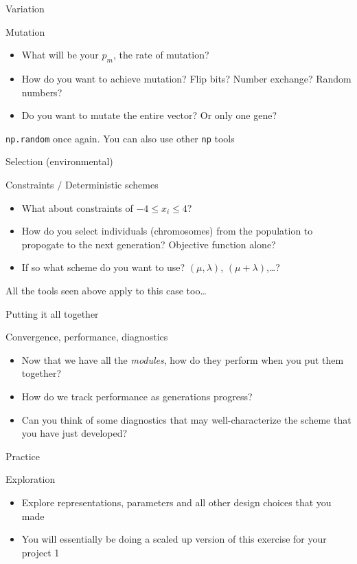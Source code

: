 \documentclass[presentation]{beamer}
\begin{document}
\begin{frame}[label={sec:org4f36e15},fragile]{Variation}
 \begin{block}{Mutation}
\begin{itemize}
\item What will be your \(p_m\), the rate of mutation?
\item How do you want to achieve mutation? Flip bits? Number exchange? Random numbers?
\item Do you want to mutate the entire vector? Or only one gene?
\end{itemize}
\end{block}
\texttt{np.random} once again. You can also use other \texttt{np} tools
\end{frame}
\begin{frame}[label={sec:orge82c7b6}]{Selection (environmental)}
\begin{block}{Constraints / Deterministic schemes}
\begin{itemize}
\item What about constraints of \(-4 \leq x_i \leq 4\)?
\item How do you select individuals (chromosomes) from the population to
propogate to the next generation? Objective function alone?
\item If so what scheme do you want to use? \(\left( \mu, \lambda \right)\),
\(\left( \mu + \lambda \right)\),\ldots{}?
\end{itemize}
\end{block}
All the tools seen above apply to this case too\ldots{}
\end{frame}
\begin{frame}[label={sec:orge229e9c}]{Putting it all together}
\begin{block}{Convergence, performance, diagnostics}
\begin{itemize}
\item Now that we have all the \emph{modules}, how do they perform when you put
them together?
\item How do we track performance as generations progress?
\item Can you think of some diagnostics that may well-characterize the scheme
that you have just developed?
\end{itemize}
\end{block}
\end{frame}
\begin{frame}[label={sec:org1bf18c1}]{Practice}
\begin{block}{Exploration}
\begin{itemize}
\item Explore representations, parameters and all other design choices that you
made
\item You will essentially be doing a scaled up version of this exercise for
your project 1
\end{itemize}
\end{block}
\end{frame}
\end{document}
